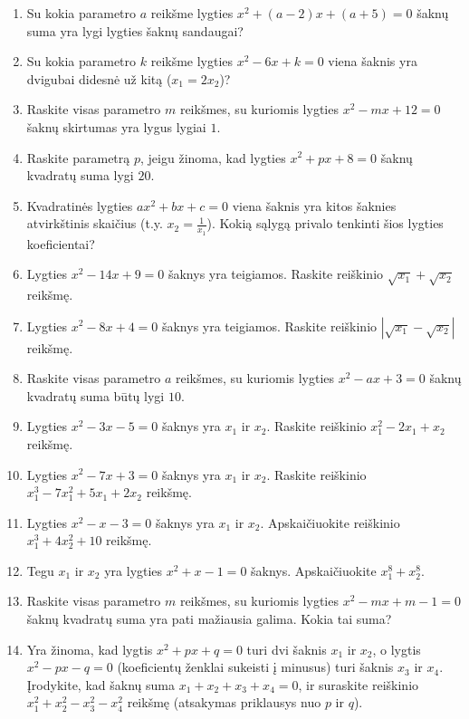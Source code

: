 \documentclass[11pt,a4paper]{scrartcl}
\begin{document}
\begin{enumerate}
    \item Su kokia parametro $a$ reikšme lygties $x^2 + (a-2)x + (a+5) = 0$ šaknų suma yra lygi lygties šaknų sandaugai?
    \item Su kokia parametro $k$ reikšme lygties $x^2 - 6x + k = 0$ viena šaknis yra dvigubai didesnė už kitą ($x_1 = 2x_2$)?
    \item Raskite visas parametro $m$ reikšmes, su kuriomis lygties $x^2 - mx + 12 = 0$ šaknų skirtumas yra lygus lygiai $1$.
    \item Raskite parametrą $p$, jeigu žinoma, kad lygties $x^2 + px + 8 = 0$ šaknų kvadratų suma lygi $20$.
    \item Kvadratinės lygties $ax^2 + bx + c = 0$ viena šaknis yra kitos šaknies atvirkštinis skaičius (t.y. $x_2 = \frac{1}{x_1}$). Kokią sąlygą privalo tenkinti šios lygties koeficientai?
    \item Lygties $x^2 - 14x + 9 = 0$ šaknys yra teigiamos. Raskite reiškinio $\sqrt{x_1} + \sqrt{x_2}$ reikšmę.
    \item Lygties $x^2 - 8x + 4 = 0$ šaknys yra teigiamos. Raskite reiškinio $|\sqrt{x_1} - \sqrt{x_2}|$ reikšmę.
    \item Raskite visas parametro $a$ reikšmes, su kuriomis lygties $x^2 - ax + 3 = 0$ šaknų kvadratų suma būtų lygi $10$.
    
    \item Lygties $x^2 - 3x - 5 = 0$ šaknys yra $x_1$ ir $x_2$. Raskite reiškinio $x_1^2 - 2x_1 + x_2$ reikšmę.
    \item Lygties $x^2 - 7x + 3 = 0$ šaknys yra $x_1$ ir $x_2$. Raskite reiškinio $x_1^3 - 7x_1^2 + 5x_1 + 2x_2$ reikšmę.
    \item Lygties $x^2 - x - 3 = 0$ šaknys yra $x_1$ ir $x_2$. Apskaičiuokite reiškinio $x_1^3 + 4x_2^2 + 10$ reikšmę.
    \item Tegu $x_1$ ir $x_2$ yra lygties $x^2 + x - 1 = 0$ šaknys. Apskaičiuokite $x_1^8 + x_2^8$.
    \item Raskite visas parametro $m$ reikšmes, su kuriomis lygties $x^2 - mx + m - 1 = 0$ šaknų kvadratų suma yra pati mažiausia galima. Kokia tai suma?
    \item Yra žinoma, kad lygtis $x^2 + px + q = 0$ turi dvi šaknis $x_1$ ir $x_2$, o lygtis $x^2 - px - q = 0$ (koeficientų ženklai sukeisti į minusus) turi šaknis $x_3$ ir $x_4$. Įrodykite, kad šaknų suma $x_1 + x_2 + x_3 + x_4 = 0$, ir suraskite reiškinio $x_1^2 + x_2^2 - x_3^2 - x_4^2$ reikšmę (atsakymas priklausys nuo $p$ ir $q$).
\end{enumerate}
\end{document}

